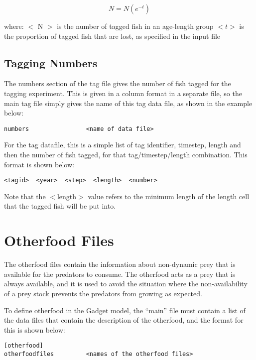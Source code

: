\documentclass[]{book}
\begin{document}
\begin{equation}
\label{eq:tagloss}
N = N (e^{-t})\end{equation}

where: \(<\) N \(>\) is the number of tagged fish in an age-length group
\(<t>\) is the proportion of tagged fish that are lost, as specified in
the input file

\hypertarget{sec:tagnumbers}{%
\section{Tagging Numbers}\label{sec:tagnumbers}}

The numbers section of the tag file gives the number of fish tagged for
the tagging experiment. This is given in a column format in a separate
file, so the main tag file simply gives the name of this tag data file,
as shown in the example below:

\begin{verbatim}
numbers                <name of data file>
\end{verbatim}

For the tag datafile, this is a simple list of tag identifier, timestep,
length and then the number of fish tagged, for that tag/timestep/length
combination. This format is shown below:

\begin{verbatim}
<tagid>  <year>  <step>  <length>  <number>
\end{verbatim}

Note that the \(<\)length\(>\) value refers to the minimum length of the
length cell that the tagged fish will be put into.

\hypertarget{chap:other}{%
\chapter{Otherfood Files}\label{chap:other}}

The otherfood files contain the information about non-dynamic prey that
is available for the predators to consume. The otherfood acts as a prey
that is always available, and it is used to avoid the situation where
the non-availability of a prey stock prevents the predators from growing
as expected.

To define otherfood in the Gadget model, the ``main'' file must contain a
list of the data files that contain the description of the otherfood,
and the format for this is shown below:

\begin{verbatim}
[otherfood]
otherfoodfiles         <names of the otherfood files>
\end{verbatim}
\end{document}
